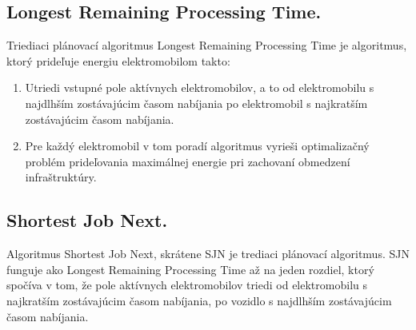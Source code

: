 \subsection{Longest Remaining Processing Time.}
Triediaci plánovací algoritmus Longest Remaining Processing Time je algoritmus, ktorý prideľuje energiu elektromobilom takto:
\begin{enumerate}
    \item Utriedi vstupné pole aktívnych elektromobilov, a to od elektromobilu s najdlhším zostávajúcim časom nabíjania po elektromobil s  najkratším zostávajúcim časom nabíjania.
    \item Pre každý elektromobil v tom poradí algoritmus vyrieši optimalizačný problém prideľovania maximálnej energie pri zachovaní obmedzení infraštruktúry. 
\end{enumerate}


\subsection{Shortest Job Next.}
Algoritmus Shortest Job Next, skrátene SJN je trediaci plánovací algoritmus. SJN funguje ako Longest Remaining Processing Time až na jeden rozdiel, ktorý spočíva v tom, že pole aktívnych elektromobilov triedi od  elektromobilu s najkratším zostávajúcim časom nabíjania, po vozidlo s najdlhším zostávajúcim časom nabíjania.



